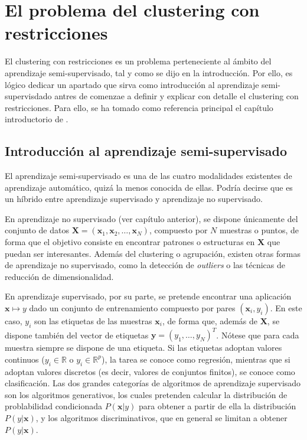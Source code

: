 \chapter{El problema del clustering con restricciones}\label{ch:clustering}

El clustering con restricciones es un problema perteneciente al ámbito del aprendizaje semi-supervisado, tal y como se dijo en la introducción. Por ello, es lógico dedicar un apartado que sirva como introducción al aprendizaje semi-supervisdado antres de comenzae a definir y explicar con detalle el clustering con restricciones. Para ello, se ha tomado como referencia principal el capítulo introductorio de \cite{chapelle2006semi}.

\section{Introducción al aprendizaje semi-supervisado}


El aprendizaje semi-supervisado es una de las cuatro modalidades existentes de aprendizaje automático, quizá la menos conocida de ellas. Podría decirse que es un híbrido entre aprendizaje supervisado y aprendizaje no supervisado.

En aprendizaje no supervisado (ver capítulo anterior), se dispone únicamente del conjunto de datos $\textbf{X} = ( \textbf{x}_1, \textbf{x}_2, \dots, \textbf{x}_N )$, compuesto por $N$ muestras o puntos, de forma que el objetivo consiste en encontrar patrones o estructuras en $\textbf{X}$ que puedan ser interesantes. Además del clustering o agrupación, existen otras formas de aprendizaje no supervisado, como la detección de \emph{outliers} o las técnicas de reducción de dimensionalidad.

En aprendizaje supervisado, por su parte, se pretende encontrar una aplicación $\textbf{x} \mapsto y$ dado un conjunto de entrenamiento compuesto por pares $(\textbf{x}_i,y_i)$. En este caso, $y_i$ son las etiquetas de las muestras $\textbf{x}_i$, de forma que, además de $\textbf{X}$, se dispone también del vector de etiquetas $\textbf{y} = (y_1,\dots,y_N)^T$. Nótese que para cada muestra siempre se dispone de una etiqueta. Si las etiquetas adoptan valores continuos ($y_i \in \mathbb{R}$ o $y_i \in \mathbb{R}^p$), la tarea se conoce como regresión, mientras que si adoptan valores discretos (es decir, valores de conjuntos finitos), se conoce como clasificación. Las dos grandes categorías de algoritmos de aprendizaje supervisado son los algoritmos generativos, los cuales pretenden calcular la distribución de problabilidad condicionada $P(\textbf{x}|y)$ para obtener a partir de ella la distribución $P(y|\textbf{x})$, y los algoritmos discriminativos, que en general se limitan a obtener $P(y|\textbf{x})$.

